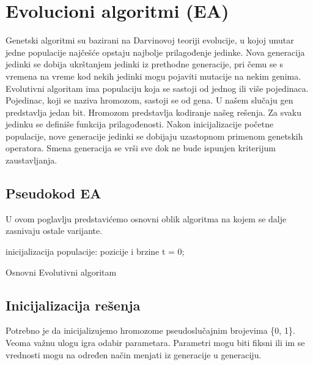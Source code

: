 \documentclass{article}
\begin{document}
\section{Evolucioni algoritmi (EA)}
Genetski algoritmi su bazirani na Darvinovoj teoriji evolucije, u kojoj unutar jedne populacije najčešće opstaju najbolje prilagođenje jedinke. Nova generacija jedinki se dobija ukrštanjem jedinki iz prethodne generacije, pri čemu se s vremena na vreme kod nekih jedinki mogu pojaviti mutacije na nekim genima. Evolutivni algoritam ima populaciju koja se sastoji od jednog ili više pojedinaca. Pojedinac, koji se naziva hromozom, sastoji se od gena. U našem slučaju gen predstavlja jedan bit. Hromozom predstavlja kodiranje našeg rešenja. Za svaku jedinku se definiše funkcija prilagođenosti. Nakon inicijalizacije početne populacije, nove generacije jedinki se dobijaju uzastopnom primenom genetskih operatora. Smena generacija se vrši sve dok ne bude ispunjen kriterijum zaustavljanja. \\


\subsection{Pseudokod EA}
U ovom poglavlju predstavićemo osnovni oblik algoritma na kojem se dalje zasnivaju ostale varijante. 

\begin{algorithm}[H]
\SetAlgoLined
{}

\BlankLine
 inicijalizacija populacije: pozicije i brzine\;
 t = 0; \\
\caption{Osnovni Evolutivni algoritam}
\end{algorithm}

\subsection{Inicijalizacija rešenja}
Potrebno je da inicijalizujemo hromozome pseudoslučajnim brojevima \{0, 1\}. Veoma važnu ulogu igra odabir parametara.  Parametri mogu biti fiksni ili im se vrednosti mogu na određen način menjati iz generacije u generaciju.
\end{document}
